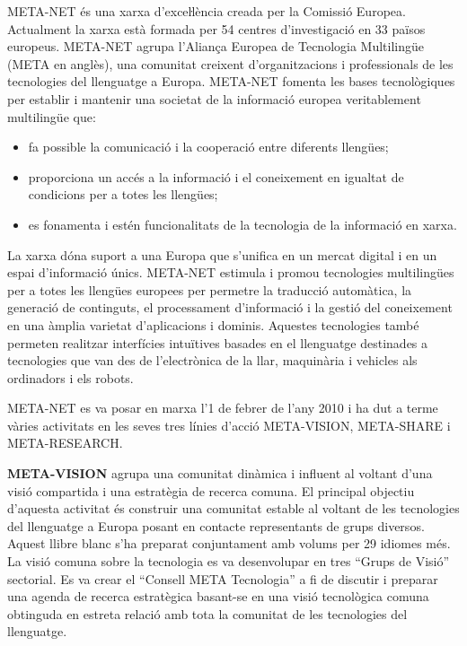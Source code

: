 \begin{multicols}{2}

META-NET és una xarxa d’exceŀlència creada per la Comissió Europea. Actualment la xarxa està formada per 54 centres d’investigació en 33 països europeus. META-NET agrupa l’Aliança Europea de Tecnologia Multilingüe (META en anglès), una comunitat creixent d’organitzacions i professionals de les tecnologies del llenguatge a Europa. META-NET fomenta les bases tecnològiques per establir i mantenir una societat de la informació europea veritablement multilingüe que:
\begin{itemize}
\item fa possible la comunicació i la cooperació entre diferents llengües;
\item proporciona un accés a la informació i el coneixement en igualtat de condicions per a totes les llengües;
\item es fonamenta i estén funcionalitats de la tecnologia de la informació en xarxa.
\end{itemize}

La xarxa dóna suport a una Europa que s'unifica en un mercat digital i en un espai d'informació únics. META-NET estimula i promou tecnologies multilingües per a totes les llengües europees per permetre la traducció automàtica, la generació de continguts, el processament d’informació i la gestió del coneixement en una àmplia varietat d’aplicacions i dominis. Aquestes tecnologies també permeten realitzar interfícies intuïtives basades en el llenguatge destinades a tecnologies que van des de l'electrònica de la llar, maquinària i vehicles als ordinadors i els robots.

META-NET es va posar en marxa l’1 de febrer de l’any 2010 i ha dut a terme vàries activitats en les seves tres línies d’acció META-VISION, META-SHARE i META-RESEARCH.

\textbf{META-VISION} agrupa una comunitat dinàmica i influent al voltant d’una visió compartida i una estratègia de recerca comuna. El principal objectiu d’aquesta activitat és construir una comunitat estable al voltant de les tecnologies del llenguatge a Europa posant en contacte representants de grups diversos. Aquest llibre blanc s'ha preparat conjuntament amb volums per 29 idiomes més. La visió comuna sobre la tecnologia es va desenvolupar en tres “Grups de Visió” sectorial. Es va crear el “Consell META Tecnologia” a fi de discutir i preparar una agenda de recerca estratègica basant-se en una visió tecnològica comuna obtinguda en estreta relació amb tota la comunitat de les tecnologies del llenguatge.


\end{multicols}
